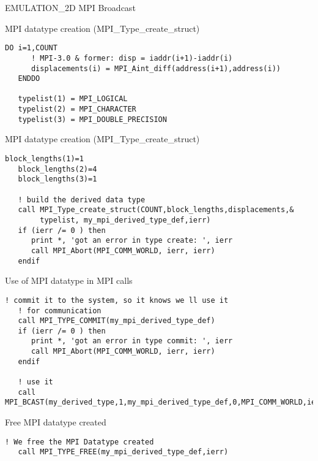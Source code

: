 \begin{frame}{EMULATION\_2D MPI Broadcast}
\begin{itemize}
\begin{block}{MPI datatype creation (MPI\_Type\_create\_struct) \insertcontinuationtext}
\begin{lstlisting}[style=myFORTRANcodeS,basicstyle=\ttfamily\footnotesize]
   DO i=1,COUNT
      ! MPI-3.0 & former: disp = iaddr(i+1)-iaddr(i)
      displacements(i) = MPI_Aint_diff(address(i+1),address(i))
   ENDDO

   typelist(1) = MPI_LOGICAL
   typelist(2) = MPI_CHARACTER
   typelist(3) = MPI_DOUBLE_PRECISION
 \end{lstlisting}
\end{block}



\begin{block}{MPI datatype creation (MPI\_Type\_create\_struct) \insertcontinuationtext}   
\begin{lstlisting}[style=myFORTRANcodeS,basicstyle=\ttfamily\footnotesize]
   block_lengths(1)=1
   block_lengths(2)=4
   block_lengths(3)=1

   ! build the derived data type
   call MPI_Type_create_struct(COUNT,block_lengths,displacements,&
        typelist, my_mpi_derived_type_def,ierr)
   if (ierr /= 0 ) then
      print *, 'got an error in type create: ', ierr
      call MPI_Abort(MPI_COMM_WORLD, ierr, ierr)
   endif

     \end{lstlisting}
   \end{block}
   
   \framebreak %
   
\begin{block}{Use of MPI datatype in MPI calls}   
\begin{lstlisting}[style=myFORTRANcodeS,basicstyle=\ttfamily\footnotesize]
   ! commit it to the system, so it knows we ll use it
   ! for communication
   call MPI_TYPE_COMMIT(my_mpi_derived_type_def)
   if (ierr /= 0 ) then
      print *, 'got an error in type commit: ', ierr
      call MPI_Abort(MPI_COMM_WORLD, ierr, ierr)
   endif

   ! use it
   call MPI_BCAST(my_derived_type,1,my_mpi_derived_type_def,0,MPI_COMM_WORLD,ierr)
 \end{lstlisting}
\end{block}

 \begin{block}{Free MPI datatype created}   
\begin{lstlisting}[style=myFORTRANcodeS,basicstyle=\ttfamily\footnotesize]
   ! We free the MPI Datatype created
   call MPI_TYPE_FREE(my_mpi_derived_type_def,ierr)
 \end{lstlisting}
\end{block}


\end{itemize}

\end{frame}

